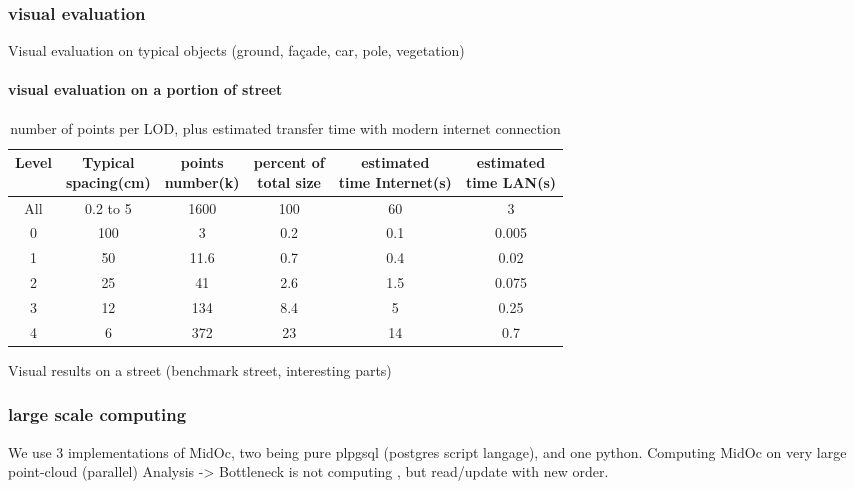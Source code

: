 		\subsubsection{visual evaluation}
			Visual evaluation on typical objects (ground, façade, car, pole, vegetation)
			\paragraph{visual evaluation on a portion of street}
			
			\begin{table}[ht]
				\centering
				\caption{ number of points per LOD, plus estimated transfer time with modern internet connection}
				\scriptsize 
				\begin{tabular}{|c|c|c|c|c|c}
				\hline Level & \shortstack{Typical \\ spacing(cm)} & \shortstack{ points \\ number(k)} & \shortstack{percent of \\ total size} & \shortstack{estimated \\ time Internet(s)} & \shortstack{estimated \\ time LAN(s)} \\
				\hline All & 0.2 to 5  & 1600 & 100 & 60 & 3 \\ 
				\hline 0 & 100 & 3 & 0.2 & 0.1 & 0.005\\ 
				\hline 1 & 50 & 11.6 & 0.7 & 0.4 & 0.02\\ 
				\hline 2 & 25 & 41 & 2.6 & 1.5 & 0.075\\ 
				\hline 3 & 12 & 134 & 8.4 & 5 & 0.25\\ 
				\hline 4 & 6 & 372 & 23 & 14 & 0.7\\  
				
				\hline 
				\end{tabular} 
			\end{table}
			
			
			Visual results on a street (benchmark street, interesting parts)
			
			
		\subsubsection{large scale computing}
			We use 3 implementations of MidOc, two being pure plpgsql (postgres script langage), and one python.
			Computing MidOc on very large point-cloud (parallel)
			Analysis -> Bottleneck is not computing , but read/update with new order. 
